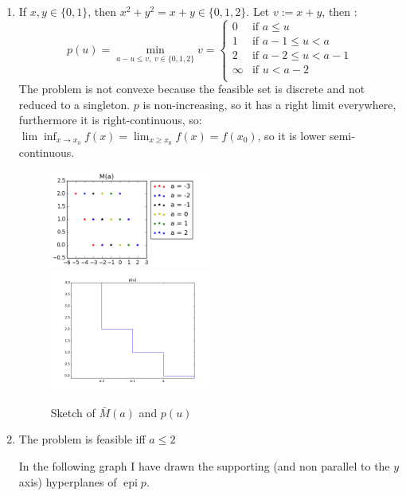 \documentclass[12pt]{article}
\DeclareMathOperator{\epi}{epi}
\begin{document}
\begin{enumerate}
\item
  
  
  If $x, y \in \{0, 1\}$, then $x^2 + y^2 = x+y \in \{0, 1, 2\}$.
  Let $v := x + y$, then :
  \[
    p(u) = \min_{a-u \le v, \; v\in\{0, 1, 2\}} v =\left\{
      \begin{array}{ll}
        0 & \text{if $a \le u$}\\
        1 & \text{if $a - 1 \le u < a$}\\
        2 & \text{if $a - 2 \le u < a-1$}\\
        \infty & \text{if $u < a - 2$}\\
      \end{array}
    \right.
  \]
  The problem is not convexe because the feasible set is discrete and not reduced to a singleton.
  $p$ is non-increasing, so it has a right limit everywhere, furthermore it is right-continuous, so: $\lim \inf_{x \rightarrow x_0} f(x) = \lim_{x \ge x_0}f(x) = f(x_0)$, so it is lower semi-continuous.


    \begin{figure}[H]
    \centering
    \includegraphics[width=0.5\textwidth]{sketch.png}
    \includegraphics[width=0.5\textwidth]{pu.png}
    \caption{Sketch of $\bar M(a)$ and $p(u)$}
  \end{figure}

  
\item
  The problem is feasible iff $a \le 2$

  In the following graph I have drawn the supporting (and non parallel to the $y$ axis) hyperplanes of $\epi p$.


\end{enumerate}
\end{document}
